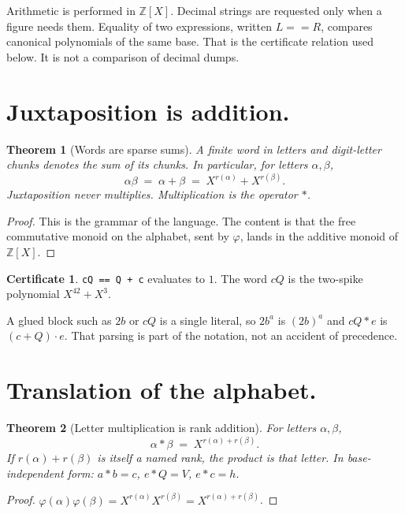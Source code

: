 \documentclass{article}
\newcommand{\ZZ}{\mathbb{Z}}
\newcommand{\rank}{r}
\newcommand{\eqc}{\mathrel{\mathtt{==}}}
\theoremstyle{plain}
\newtheorem{theorem}{Theorem}
\theoremstyle{definition}
\newtheorem*{certificate}{Certificate}
\theoremstyle{remark}
\begin{document}
Arithmetic is performed in \(\ZZ[X]\). Decimal strings are requested only
when a figure needs them. Equality of two expressions, written
\(L \eqc R\), compares canonical polynomials of the same base. That is the
certificate relation used below. It is not a comparison of decimal dumps.

\section{Juxtaposition is addition.}
\label{sec:juxtaposition}

\begin{theorem}[Words are sparse sums]
\label{thm:words}
A finite word in letters and digit-letter chunks denotes the sum of its
chunks. In particular, for letters \(\alpha,\beta\),
\[
\alpha\beta \;=\; \alpha + \beta \;=\; X^{\rank(\alpha)} + X^{\rank(\beta)}.
\]
Juxtaposition never multiplies. Multiplication is the operator \(*\).
\end{theorem}

\begin{proof}
This is the grammar of the language. The content is that the free
commutative monoid on the alphabet, sent by \(\varphi\), lands in the
additive monoid of \(\ZZ[X]\).
\end{proof}

\begin{certificate}
\texttt{cQ == Q + c} evaluates to \(1\). The word \(cQ\) is the
two-spike polynomial \(X^{42}+X^3\).
\end{certificate}

A glued block such as \(2b\) or \(cQ\) is a single literal, so \(2b^a\) is
\((2b)^a\) and \(cQ * e\) is \((c+Q)\cdot e\). That parsing is part of the
notation, not an accident of precedence.

\section{Translation of the alphabet.}
\label{sec:translation}

\begin{theorem}[Letter multiplication is rank addition]
\label{thm:rank-add}
For letters \(\alpha,\beta\),
\[
\alpha * \beta \;=\; X^{\rank(\alpha)+\rank(\beta)}.
\]
If \(\rank(\alpha)+\rank(\beta)\) is itself a named rank, the product
\emph{is} that letter. In base-independent form: \(a*b=c\), \(e*Q=V\),
\(e*c=h\).
\end{theorem}

\begin{proof}
\(\varphi(\alpha)\varphi(\beta)
= X^{\rank(\alpha)} X^{\rank(\beta)}
= X^{\rank(\alpha)+\rank(\beta)}\).
\end{proof}
\end{document}
